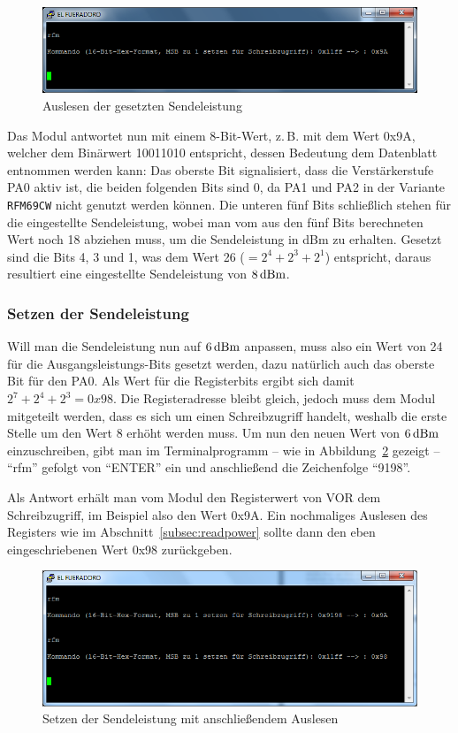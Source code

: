 \documentclass[pdftex, parskip, numbers=noenddot, toc=listof]{scrbook}
\begin{document}
	\begin{figure}
		\centering
		\includegraphics[width=.8\textwidth]{Bilder/rfmbefehl}
		\caption{Auslesen der gesetzten Sendeleistung}
		\label{fig:rfmread}
	\end{figure}

	Das Modul antwortet nun mit einem 8-Bit-Wert, z.\,B. mit dem Wert 0x9A, welcher dem Binärwert 10011010 entspricht, dessen Bedeutung dem Datenblatt entnommen werden kann: Das oberste Bit signalisiert, dass die Verstärkerstufe PA0 aktiv ist, die beiden folgenden Bits sind 0, da PA1 und PA2 in der Variante \texttt{RFM69CW} nicht genutzt werden können. Die unteren fünf Bits schließlich stehen für die eingestellte Sendeleistung, wobei man vom aus den fünf Bits berechneten Wert noch 18 abziehen muss, um die Sendeleistung in dBm zu erhalten. Gesetzt sind die Bits 4, 3 und 1, was dem Wert 26 ($= 2^4 + 2^3 + 2^1$) entspricht, daraus resultiert eine eingestellte Sendeleistung von $\unit[8]{dBm}$.

	\subsubsection{Setzen der Sendeleistung}

	Will man die Sendeleistung nun auf $\unit[6]{dBm}$ anpassen, muss also ein Wert von 24 für die Aus\-gangs\-lei\-stungs-Bits gesetzt werden, dazu natürlich auch das oberste Bit für den PA0. Als Wert für die Registerbits ergibt sich damit $2^7 + 2^4 + 2^3 = 0x98$. Die Registeradresse bleibt gleich, jedoch muss dem Modul mitgeteilt werden, dass es sich um einen Schreibzugriff handelt, weshalb die erste Stelle um den Wert 8 erhöht werden muss. Um nun den neuen Wert von $\unit[6]{dBm}$ einzuschreiben, gibt man im Terminalprogramm -- wie in Abbildung~\ref{fig:rfmwrite} gezeigt -- \enquote{rfm} gefolgt von \enquote{ENTER} ein und anschließend die Zeichenfolge \enquote{9198}.

	Als Antwort erhält man vom Modul den Registerwert von VOR dem Schreibzugriff, im Beispiel also den Wert 0x9A. Ein nochmaliges Auslesen des Registers wie im Abschnitt~\ref{subsec:readpower} sollte dann den eben eingeschriebenen Wert 0x98 zurückgeben.

	\begin{figure}[b]
		\centering
		\includegraphics[width=.8\textwidth]{Bilder/rfmbefehl2}
		\caption{Setzen der Sendeleistung mit anschließendem Auslesen}
		\label{fig:rfmwrite}
	\end{figure}
	\clearpage
\end{document}
